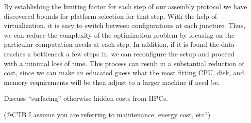 By establishing the limiting factor for each step of our assembly
protocol  we have discovered bounds for platform selection for that
step. With the help of virtualization, it is easy to switch between
configurations at each  juncture. Thus, we can reduce the complexity
of the optimization problem by  focusing on the particular computation
needs at each step. In addition, if it is found the data reaches a
bottleneck a few steps in, we can reconfigure the setup and proceed
with a minimal loss of time. This process can result in a  substantial
reduction of cost, since we can make an educated guess what the  most
fitting CPU, disk, and memory requirements will be then adjust to a
larger machine if need be.

Discuss ``surfacing'' otherwise hidden costs from HPCs.

(@CTB I assume you are referring to maintenance, energy cost, etc?)



